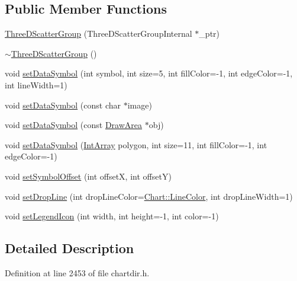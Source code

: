 \subsection*{Public Member Functions}
\begin{DoxyCompactItemize}
\item 
\hyperlink{class_three_d_scatter_group_aa807dd27f42833383d62ad07b5cb5407}{Three\+D\+Scatter\+Group} (Three\+D\+Scatter\+Group\+Internal $\ast$\+\_\+ptr)
\item 
\hyperlink{class_three_d_scatter_group_ae0cad1a60292ee278299a1c934ac158e}{$\sim$\+Three\+D\+Scatter\+Group} ()
\item 
void \hyperlink{class_three_d_scatter_group_ad4c071c469fa09c4c96f204f42c81a4b}{set\+Data\+Symbol} (int symbol, int size=5, int fill\+Color=-\/1, int edge\+Color=-\/1, int line\+Width=1)
\item 
void \hyperlink{class_three_d_scatter_group_ab34e6305a2ee0a3b536d1e3144343dc4}{set\+Data\+Symbol} (const char $\ast$image)
\item 
void \hyperlink{class_three_d_scatter_group_aa656b4d391c2ff8594667cf1f62aedc3}{set\+Data\+Symbol} (const \hyperlink{class_draw_area}{Draw\+Area} $\ast$obj)
\item 
void \hyperlink{class_three_d_scatter_group_a300cece2b98d9b32714dde52c96b58e1}{set\+Data\+Symbol} (\hyperlink{class_int_array}{Int\+Array} polygon, int size=11, int fill\+Color=-\/1, int edge\+Color=-\/1)
\item 
void \hyperlink{class_three_d_scatter_group_a55fc5e93a7eed2319f694140c505cf2d}{set\+Symbol\+Offset} (int offsetX, int offsetY)
\item 
void \hyperlink{class_three_d_scatter_group_a2b595091d992d417f3ff9cca595edc28}{set\+Drop\+Line} (int drop\+Line\+Color=\hyperlink{namespace_chart_abee0d882fdc9ad0b001245ad9fc64011a04817a359476e87a5c572a7a69cdaaec}{Chart\+::\+Line\+Color}, int drop\+Line\+Width=1)
\item 
void \hyperlink{class_three_d_scatter_group_a37983f9639976b290bc7c50b0382a1dc}{set\+Legend\+Icon} (int width, int height=-\/1, int color=-\/1)
\end{DoxyCompactItemize}


\subsection{Detailed Description}


Definition at line 2453 of file chartdir.\+h.



